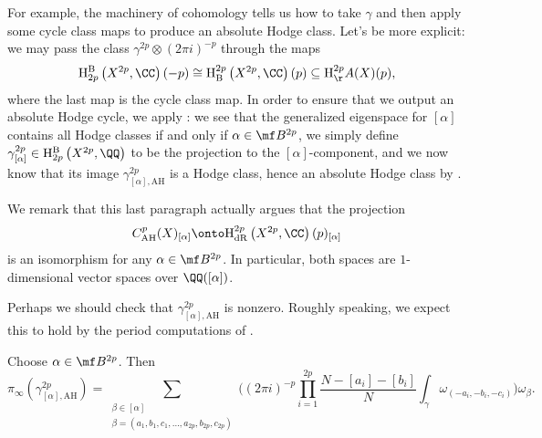 \documentclass[../thesis.tex]{subfiles}
\begin{document}
For example, the machinery of cohomology tells us how to take $\gamma$ and then apply some cycle class maps to produce an absolute Hodge class. Let's be more explicit: we may pass the class $\gamma^{2p}\otimes(2\pi i)^{-p}$ through the maps
\[\mathrm H^{\mathrm B}_{2p}\left(X^{2p},\CC\right)(-p)\cong\mathrm H^{2p}_{\mathrm B}\left(X^{2p},\CC\right)(p)\subseteq\mathrm H^{2p}_\AA(X)(p),\]
where the last map is the cycle class map. In order to ensure that we output an absolute Hodge cycle, we apply : we see that the generalized eigenspace for $[\alpha]$ contains all Hodge classes if and only if $\alpha\in\mf B^{2p}$, we simply define $\gamma^{2p}_{[\alpha]}\in\mathrm H^{\mathrm B}_{2p}\left(X^{2p},\QQ\right)$ to be the projection to the $[\alpha]$-component, and we now know that its image $\gamma^{2p}_{[\alpha],\mathrm{AH}}$ is a Hodge class, hence an absolute Hodge class by .
\begin{remark} \label{rem:fermat-lift-hodge-to-abs-hodge}
	We remark that this last paragraph actually argues that the projection
	\[C^p_{\mathrm{AH}}(X)_{[\alpha]}\onto\mathrm H^{2p}_{\mathrm{dR}}\left(X^{2p},\CC\right)(p)_{[\alpha]}\]
	is an isomorphism for any $\alpha\in\mf B^{2p}$. In particular, both spaces are $1$-dimensional vector spaces over $\QQ([\alpha])$. %
\end{remark}
Perhaps we should check that $\gamma_{[\alpha],\mathrm{AH}}^{2p}$ is nonzero. Roughly speaking, we expect this to hold by the period computations of .
\begin{proposition} \label{prop:fermat-abs-hodge-in-hodge-basis}
	Choose $\alpha\in\mf B^{2p}$. Then
	\[\pi_\infty\left(\gamma_{[\alpha],\mathrm{AH}}^{2p}\right)=\sum_{\substack{\beta\in[\alpha]\\\beta=(a_1,b_1,c_1,\ldots,a_{2p},b_{2p},c_{2p})}}\Bigg((2\pi i)^{-p}\prod_{i=1}^{2p}\frac{N-[a_i]-[b_i]}{N}\int_{\gamma}\omega_{(-a_i,-b_i,-c_i)}\Bigg)\omega_{\beta}.\]
\end{proposition}
\end{document}

